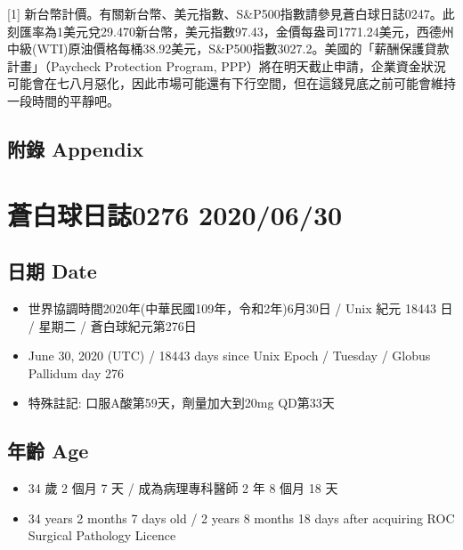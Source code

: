 \documentclass[
]{article}
\providecommand{\tightlist}{%
  \setlength{\itemsep}{0pt}\setlength{\parskip}{0pt}}
\begin{document}
{[}1{]}
新台幣計價。有關新台幣、美元指數、S\&P500指數請參見蒼白球日誌0247。此刻匯率為1美元兌29.470新台幣，美元指數97.43，金價每盎司1771.24美元，西德州中級(WTI)原油價格每桶38.92美元，S\&P500指數3027.2。美國的「薪酬保護貸款計畫」（Paycheck
Protection Program,
PPP）將在明天截止申請，企業資金狀況可能會在七八月惡化，因此市場可能還有下行空間，但在這錢見底之前可能會維持一段時間的平靜吧。

\hypertarget{ux9644ux9304-appendix-24}{%
\subsection{附錄 Appendix}\label{ux9644ux9304-appendix-24}}

\hypertarget{ux84bcux767dux7403ux65e5ux8a8c0276-20200630}{%
\section{蒼白球日誌0276
2020/06/30}\label{ux84bcux767dux7403ux65e5ux8a8c0276-20200630}}

\hypertarget{ux65e5ux671f-date-25}{%
\subsection{日期 Date}\label{ux65e5ux671f-date-25}}

\begin{itemize}
\tightlist
\item
  世界協調時間2020年(中華民國109年，令和2年)6月30日 / Unix 紀元 18443 日
  / 星期二 / 蒼白球紀元第276日
\item
  June 30, 2020 (UTC) / 18443 days since Unix Epoch / Tuesday / Globus
  Pallidum day 276
\item
  特殊註記: 口服A酸第59天，劑量加大到20mg QD第33天
\end{itemize}

\hypertarget{ux5e74ux9f61-age-25}{%
\subsection{年齡 Age}\label{ux5e74ux9f61-age-25}}

\begin{itemize}
\tightlist
\item
  34 歲 2 個月 7 天 / 成為病理專科醫師 2 年 8 個月 18 天
\item
  34 years 2 months 7 days old / 2 years 8 months 18 days after
  acquiring ROC Surgical Pathology Licence
\end{itemize}
\end{document}
